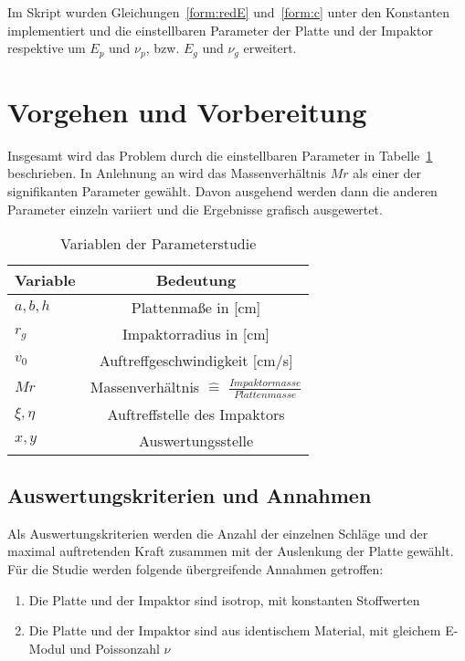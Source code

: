 Im Skript wurden Gleichungen~\ref{form:redE} und~\ref{form:c} unter den Konstanten implementiert und die einstellbaren Parameter der Platte und der Impaktor respektive um $E_{p}$ und $\nu_{p}$, bzw. $E_{g}$ und $\nu_{g}$ erweitert.\\

\section{Vorgehen und Vorbereitung}

Insgesamt wird das Problem durch die einstellbaren Parameter in Tabelle~\ref{tab:VariablenderStudie} beschrieben. In Anlehnung an \cite{Olsson.2000} wird das Massenverhältnis $Mr$ als einer der signifikanten Parameter gewählt. Davon ausgehend werden dann die anderen Parameter einzeln variiert und die Ergebnisse grafisch ausgewertet. 

\begin{table}[H]
	\begin{center}
		\caption{Variablen der Parameterstudie}
		\label{tab:VariablenderStudie}
		\begin{tabular}{l|c}
			\textbf{Variable} & \textbf{Bedeutung}\\
			\hline
			$a,b,h$ & Plattenmaße in [cm]\\
			$r_{g}$ & Impaktorradius in [cm]\\
			$v_{0}$ & Auftreffgeschwindigkeit [cm/s]\\
			$Mr$ & Massenverhältnis $\hat{=}$ $\frac{Impaktormasse}{Plattenmasse}$\\
			$\xi,\eta$ & Auftreffstelle des Impaktors\\
			$x,y$ & Auswertungsstelle\\		
		\end{tabular}
	\end{center}
\end{table}

\subsection{Auswertungskriterien und Annahmen}

Als Auswertungskriterien werden die Anzahl der einzelnen Schläge und der maximal auftretenden Kraft zusammen mit der Auslenkung der Platte gewählt. \\
Für die Studie werden folgende übergreifende Annahmen getroffen: 

\begin{enumerate}
	\item{Die Platte und der Impaktor sind isotrop, mit konstanten Stoffwerten}
	\item{Die Platte und der Impaktor sind aus identischem Material, mit gleichem E-Modul und Poissonzahl $\nu$}
\end{enumerate}

